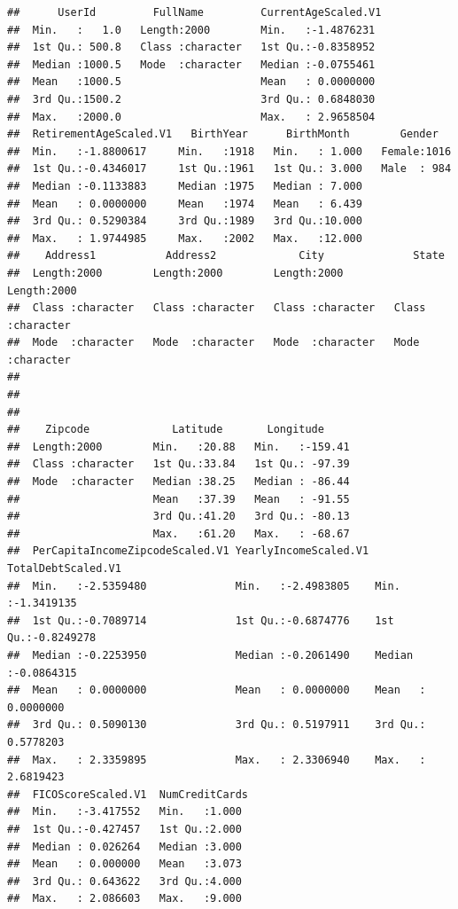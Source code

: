\documentclass[
]{article}
\begin{document}
\begin{verbatim}
##      UserId         FullName         CurrentAgeScaled.V1 
##  Min.   :   1.0   Length:2000        Min.   :-1.4876231  
##  1st Qu.: 500.8   Class :character   1st Qu.:-0.8358952  
##  Median :1000.5   Mode  :character   Median :-0.0755461  
##  Mean   :1000.5                      Mean   : 0.0000000  
##  3rd Qu.:1500.2                      3rd Qu.: 0.6848030  
##  Max.   :2000.0                      Max.   : 2.9658504  
##  RetirementAgeScaled.V1   BirthYear      BirthMonth        Gender    
##  Min.   :-1.8800617     Min.   :1918   Min.   : 1.000   Female:1016  
##  1st Qu.:-0.4346017     1st Qu.:1961   1st Qu.: 3.000   Male  : 984  
##  Median :-0.1133883     Median :1975   Median : 7.000                
##  Mean   : 0.0000000     Mean   :1974   Mean   : 6.439                
##  3rd Qu.: 0.5290384     3rd Qu.:1989   3rd Qu.:10.000                
##  Max.   : 1.9744985     Max.   :2002   Max.   :12.000                
##    Address1           Address2             City              State          
##  Length:2000        Length:2000        Length:2000        Length:2000       
##  Class :character   Class :character   Class :character   Class :character  
##  Mode  :character   Mode  :character   Mode  :character   Mode  :character  
##                                                                             
##                                                                             
##                                                                             
##    Zipcode             Latitude       Longitude      
##  Length:2000        Min.   :20.88   Min.   :-159.41  
##  Class :character   1st Qu.:33.84   1st Qu.: -97.39  
##  Mode  :character   Median :38.25   Median : -86.44  
##                     Mean   :37.39   Mean   : -91.55  
##                     3rd Qu.:41.20   3rd Qu.: -80.13  
##                     Max.   :61.20   Max.   : -68.67  
##  PerCapitaIncomeZipcodeScaled.V1 YearlyIncomeScaled.V1  TotalDebtScaled.V1 
##  Min.   :-2.5359480              Min.   :-2.4983805    Min.   :-1.3419135  
##  1st Qu.:-0.7089714              1st Qu.:-0.6874776    1st Qu.:-0.8249278  
##  Median :-0.2253950              Median :-0.2061490    Median :-0.0864315  
##  Mean   : 0.0000000              Mean   : 0.0000000    Mean   : 0.0000000  
##  3rd Qu.: 0.5090130              3rd Qu.: 0.5197911    3rd Qu.: 0.5778203  
##  Max.   : 2.3359895              Max.   : 2.3306940    Max.   : 2.6819423  
##  FICOScoreScaled.V1  NumCreditCards 
##  Min.   :-3.417552   Min.   :1.000  
##  1st Qu.:-0.427457   1st Qu.:2.000  
##  Median : 0.026264   Median :3.000  
##  Mean   : 0.000000   Mean   :3.073  
##  3rd Qu.: 0.643622   3rd Qu.:4.000  
##  Max.   : 2.086603   Max.   :9.000
\end{verbatim}
\end{document}
